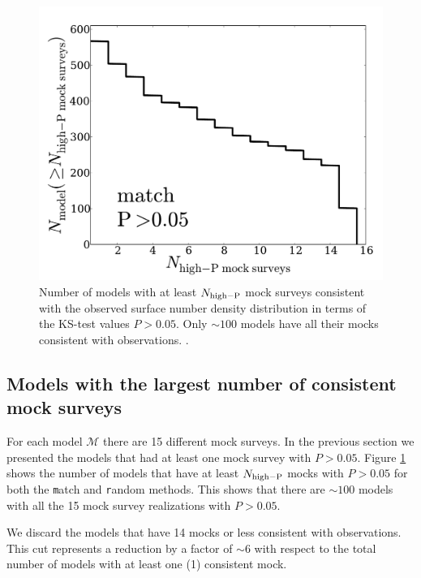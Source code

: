 \documentclass[usenatbib]{mn2e}
\begin{document}
\begin{figure}
\begin{center}
\includegraphics[width=0.95\linewidth,angle=0]{./plots/Fig4_match_P5.pdf}
\end{center} 
\caption{ Number of models with at least $N_{\rm high-P}$ mock surveys
  consistent with the observed surface number density
  distribution in terms of the KS-test values $P>0.05$. Only $\sim
  100$ models have all their mocks consistent with observations. 
  \label{fig:high_success_rate}.}  
\end{figure}
 
\subsection{Models with the largest number of consistent mock surveys}

For each model ${\mathcal M}$ there are 15 different mock surveys. In the
previous section we presented the models that had at least one
mock survey with $P>0.05$. Figure \ref{fig:high_success_rate} shows the number of models
that have at least $N_{\rm high-P}$ mocks with $P>0.05$ for both the
{\texttt  match} and {\texttt random} methods.  This shows that there
are $\sim 100$ models with all the 15 mock survey realizations with
$P>0.05$.  

We discard the models that have 14 mocks or less consistent with observations.
This cut represents a reduction by a factor of $\sim 6$ with respect
to the total number of models with at least one (1) consistent mock.
\end{document}
